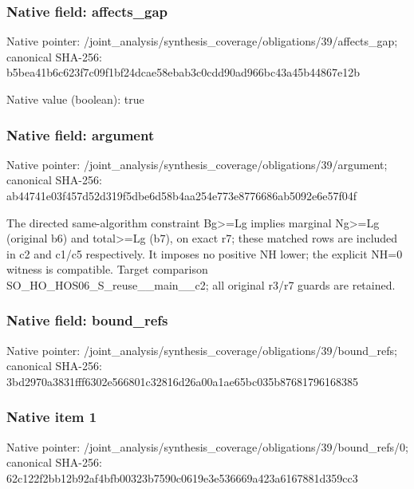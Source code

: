 \documentclass[10pt,a4paper]{article}
\begin{document}
\subsubsection{Native field: affects\_\allowbreak{}gap}
Native pointer: /joint\_\allowbreak{}analysis/synthesis\_\allowbreak{}coverage/obligations/39/affects\_\allowbreak{}gap; canonical SHA-256: b5bea41b6c623f7c09f1bf24dcae58ebab3c0cdd90ad966bc43a45b44867e12b

Native value (boolean): true

\subsubsection{Native field: argument}
Native pointer: /joint\_\allowbreak{}analysis/synthesis\_\allowbreak{}coverage/obligations/39/argument; canonical SHA-256: ab44741e03f457d52d319f5dbe6d58b4aa254e773e8776686ab5092e6e57f04f

\begingroup\raggedright\sloppy The directed same-algorithm constraint Bg>=\allowbreak{}Lg implies marginal Ng>=\allowbreak{}Lg (original b6) and total>=\allowbreak{}Lg (b7),\allowbreak{} on exact r7;\allowbreak{} these matched rows are included in c2 and c1/\allowbreak{}c5 respectively. It imposes no positive NH lower;\allowbreak{} the explicit NH=\allowbreak{}0 witness is compatible. Target comparison SO\_\allowbreak{}HO\_\allowbreak{}HOS06\_\allowbreak{}S\_\allowbreak{}reuse\_\allowbreak{}\_\allowbreak{}main\_\allowbreak{}\_\allowbreak{}c2;\allowbreak{} all original r3/\allowbreak{}r7 guards are retained.\par\endgroup

\subsubsection{Native field: bound\_\allowbreak{}refs}
Native pointer: /joint\_\allowbreak{}analysis/synthesis\_\allowbreak{}coverage/obligations/39/bound\_\allowbreak{}refs; canonical SHA-256: 3bd2970a3831fff6302e566801c32816d26a00a1ae65bc035b87681796168385

\subsubsection{Native item 1}
Native pointer: /joint\_\allowbreak{}analysis/synthesis\_\allowbreak{}coverage/obligations/39/bound\_\allowbreak{}refs/0; canonical SHA-256: 62c122f2bb12b92af4bfb00323b7590c0619e3e536669a423a6167881d359cc3
\end{document}
